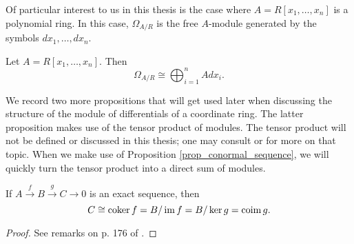 Of particular interest to us in this thesis is the case where $A = R[x_1, \ldots, x_n]$ is a polynomial ring.
In this case, $\Omega_{A/R}$ is the free $A$-module generated by the symbols $dx_1, \ldots, dx_n$.
\begin{proposition}
  \label{prop_differential_module_of_polynomial_ring}
  Let $A = R[x_1, \ldots, x_n]$. Then
  \[ \Omega_{A/R} \cong \bigoplus_{i=1}^n Adx_i. \]
\end{proposition}
\begin{comment}
\begin{corollary}
  Let $A = R[x_1, \ldots, x_n]$, let $I$ be an ideal of $A$, and let $B = A/I$.
  Then $B$ is an $R$-algebra and
  \[ B \otimes_{R} \Omega_{A/R} \cong \bigoplus_{i=1}^n Bdx_i. \]
\end{corollary}
\begin{proof}
  \note{Extension of scalars.}
\end{proof}
Here $\otimes_R$ denotes the tensor product of algebra.
We will use this corollary in Chapter \ref{chap_curves}, after defining the coordinate ring of a curve,
when relating differentials forms of a polynomial ring to those of a coordinate ring.
Since $\Omega_{A/R}$ is a direct sum of $R$-algebras $Adx_i$,
there is a family of natural projection maps 
  \[ \pi_i : \Omega_{A/R} \to Adx_i : \sum f_jdx_j \mapsto f_idx_i. \]
We can compose the maps
  \[ \begin{tikzcd}
    A \arrow{r}{d} & \Omega_{A/R} \arrow{r}{\pi_i} & Adx_i \arrow{r}{} & A
  \end{tikzcd} \]
where the right-most map sends $dx_i \mapsto 1$.
The composition of the three maps is the formal partial derivative with respect to $x_i$.
\end{comment}
We record two more propositions that will get used later when discussing the structure
of the module of differentials of a coordinate ring.
The latter proposition makes use of the tensor product of modules.
The tensor product will not be defined or discussed in this thesis;
one may consult \cite{eisenbud95} or \cite{hungerford} for more on that topic.
When we make use of Proposition \ref{prop_conormal_sequence},
we will quickly turn the tensor product into a direct sum of modules.
\begin{proposition}
  \label{prop_exact_sequence_cokernel}
  If $A \xrightarrow f B \xrightarrow g C \to 0$ is an exact sequence, then
    \[ C \cong \operatorname{coker} f = B / \operatorname{im} f = B / \ker g = \operatorname{coim} g. \]
\end{proposition}
\begin{proof}
  See remarks on p. 176 of \cite{hungerford}.
\end{proof}

